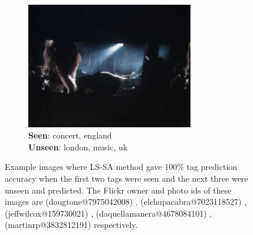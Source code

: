 \begin{figure}
\begin{subfigure}[b]{0.16\textwidth}
                \label{fig:posex4}
        \end{subfigure}%
	\; \vline
        \; %
        \begin{subfigure}[b]{0.17\textwidth}
                \includegraphics[width=0.8\textwidth]{TagTree/Flickrimg/8efd5e1c-6d83-37af-91a2-1484a9d823b3.jpeg}
                \caption{\textbf{Seen}: concert, england\\ \textbf{Unseen}: london, music, uk }
                \label{fig:posex5}
        \end{subfigure}
        \caption[Example images where LS-SA method gave 100\% tag prediction accuracy when the first two tags were seen and the next three were unseen and predicted. ]{Example images where LS-SA method gave 100\% tag prediction accuracy when the first two tags were seen and the next three were unseen and predicted. The Flickr owner and photo ids of these images are (dougtone@7975042008) ,  (elchupacabra@7023118527) , (jeffwilcox@159730021) , (daquellamanera@4678084101) , (martinrp@3832812191)  respectively. } \label{fig:positiveExs}
\end{figure}

